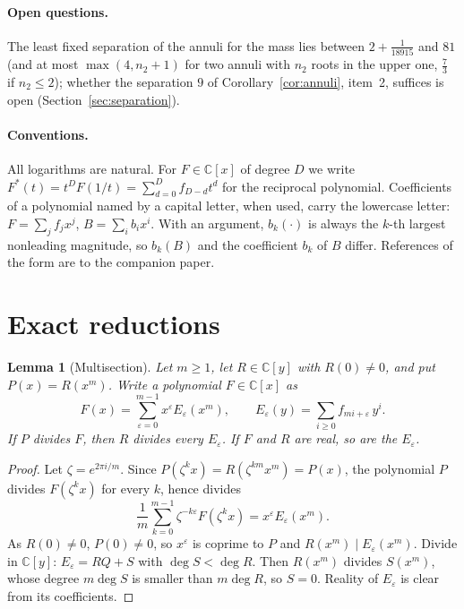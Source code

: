 \documentclass[11pt]{article}
\newtheorem{lemma}[theorem]{Lemma}
\begin{document}
\paragraph{Open questions.}  The least fixed separation of the annuli
for the mass lies between $2+\frac1{18915}$ and $81$ (and at most
$\max(4,n_2+1)$ for two annuli with $n_2$ roots in the upper one,
$\frac73$ if $n_2\le2$); whether the separation $9$ of
Corollary~\ref{cor:annuli}, item~2, suffices is open
(Section~\ref{sec:separation}).

\paragraph{Conventions.}
All logarithms are natural.  For $F\in\mathbb C[x]$ of degree $D$ we write
$F^*(t)=t^DF(1/t)=\sum_{d=0}^Df_{D-d}t^d$ for the reciprocal polynomial.
Coefficients of a polynomial named by a capital letter, when used, carry the
lowercase letter: $F=\sum_jf_jx^j$, $B=\sum_ib_ix^i$.  With an argument,
$b_k(\cdot)$ is always the $k$-th largest nonleading magnitude, so $b_k(B)$
and the coefficient $b_k$ of $B$ differ.
References of the form \cite[Theorem~3.2]{coefficient-mass} are to the
companion paper.

\section{Exact reductions}\label{sec:exact}

\begin{lemma}[Multisection]\label{lem:multisection}
Let $m\ge1$, let $R\in\mathbb C[y]$ with $R(0)\ne0$, and put $P(x)=R(x^m)$.  Write
a polynomial $F\in\mathbb C[x]$ as
\[
  F(x)=\sum_{\varepsilon=0}^{m-1}x^\varepsilon E_\varepsilon(x^m),
  \qquad E_\varepsilon(y)=\sum_{i\ge0}f_{mi+\varepsilon}\,y^i .
\]
If $P$ divides $F$, then $R$ divides every $E_\varepsilon$.  If $F$ and $R$
are real, so are the $E_\varepsilon$.
\end{lemma}

\begin{proof}
Let $\zeta=e^{2\pi i/m}$.  Since $P(\zeta^kx)=R(\zeta^{km}x^m)=P(x)$, the
polynomial $P$ divides $F(\zeta^kx)$ for every $k$, hence divides
\[
  \frac1m\sum_{k=0}^{m-1}\zeta^{-k\varepsilon}F(\zeta^kx)
  =x^\varepsilon E_\varepsilon(x^m).
\]
As $R(0)\ne0$, $P(0)\ne0$, so $x^\varepsilon$ is coprime to $P$ and
$R(x^m)\mid E_\varepsilon(x^m)$.  Divide in $\mathbb C[y]$:
$E_\varepsilon=RQ+S$ with $\deg S<\deg R$.  Then $R(x^m)$ divides
$S(x^m)$, whose degree $m\deg S$ is smaller than $m\deg R$, so $S=0$.
Reality of $E_\varepsilon$ is clear from its coefficients.
\end{proof}
\end{document}
